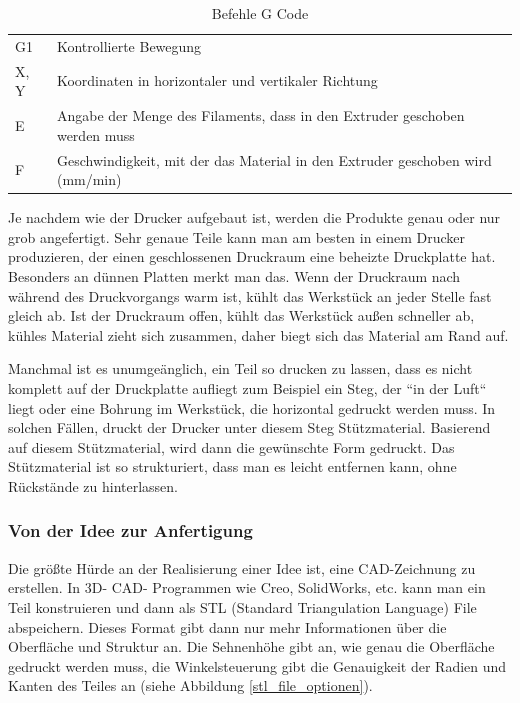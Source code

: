 			\begin{table}[htbp]
  		\centering
  		\caption{Befehle G Code}
	    \begin{tabular}{ll}
	    G1    & Kontrollierte Bewegung \\
	    X, Y  & Koordinaten in horizontaler und vertikaler Richtung \\
	    E     & Angabe der Menge des Filaments, dass in den Extruder geschoben werden muss \\
	    F     & Geschwindigkeit, mit der das Material in den Extruder geschoben wird (mm/min) \\
	    \end{tabular}%
	  	\label{tab:befehle gcode}%
			\end{table}%

		Je nachdem wie der Drucker aufgebaut ist, werden die Produkte genau oder nur grob angefertigt.
		Sehr genaue Teile kann man am besten in einem Drucker produzieren, der einen geschlossenen Druckraum \bzw eine beheizte Druckplatte hat.
		Besonders an dünnen Platten merkt man das.
		Wenn der Druckraum nach \bzw während des Druckvorgangs warm ist, kühlt das Werkstück an jeder Stelle fast gleich ab.
		Ist der Druckraum offen, kühlt das Werkstück außen schneller ab, kühles Material zieht sich zusammen, daher biegt sich das Material am Rand auf.

		Manchmal ist es unumgeänglich, ein Teil so drucken zu lassen, dass es nicht komplett auf der Druckplatte aufliegt zum Beispiel ein Steg,
		der “in der Luft“ liegt oder eine Bohrung im Werkstück, die horizontal gedruckt werden muss.
		In solchen Fällen, druckt der Drucker unter diesem Steg Stützmaterial. Basierend auf diesem Stützmaterial, wird dann die gewünschte Form gedruckt.
		Das Stützmaterial ist so strukturiert, dass man es leicht entfernen kann, ohne Rückstände zu hinterlassen.

		\subsubsection{Von der Idee zur Anfertigung}

		Die größte Hürde an der Realisierung einer Idee ist, eine CAD-Zeichnung zu erstellen. In 3D- CAD- Programmen wie Creo, SolidWorks, etc. kann man ein Teil konstruieren und dann als STL (Standard Triangulation Language) File abspeichern.
		Dieses Format gibt dann nur mehr Informationen über die Oberfläche und Struktur an.
		Die Sehnenhöhe gibt an, wie genau die Oberfläche gedruckt werden muss, die Winkelsteuerung gibt die Genauigkeit der Radien und Kanten des Teiles an (siehe Abbildung \ref{stl_file_optionen}).


